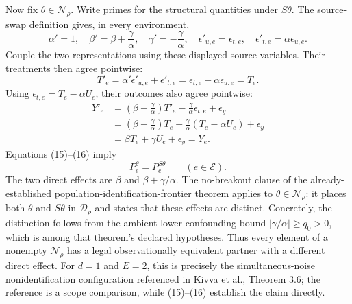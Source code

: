 Now fix \(\theta\in\mathcal N_\rho\).  Write primes for the structural quantities under \(S\theta\).  The source-swap definition gives, in every environment,
\[
 \alpha'=1,
 \quad
 \beta'=\beta+\frac{\gamma}{\alpha},
 \quad
 \gamma'=-\frac{\gamma}{\alpha},
 \quad
 \epsilon'_{u,e}=\epsilon_{t,e},
 \quad
 \epsilon'_{t,e}=\alpha\epsilon_{u,e}.
\]
Couple the two representations using these displayed source variables.  Their treatments then agree pointwise:
\[
 T'_e
 =\alpha'\epsilon'_{u,e}+\epsilon'_{t,e}
 =\epsilon_{t,e}+\alpha\epsilon_{u,e}
 =T_e.
 \tag{15}
\]
Using \(\epsilon_{t,e}=T_e-\alpha U_e\), their outcomes also agree pointwise:
\[
 \begin{aligned}
 Y'_e
 &=\left(\beta+\frac{\gamma}{\alpha}\right)T'_e
   -\frac{\gamma}{\alpha}\epsilon_{t,e}+\epsilon_y\\
 &=\left(\beta+\frac{\gamma}{\alpha}\right)T_e
   -\frac{\gamma}{\alpha}(T_e-\alpha U_e)+\epsilon_y\\
 &=\beta T_e+\gamma U_e+\epsilon_y
 =Y_e.
 \end{aligned}
 \tag{16}
\]
Equations (15)--(16) imply
\[
 P_e^{\theta}=P_e^{S\theta}
 \qquad(e\in\mathcal E).
\]
The two direct effects are \(\beta\) and \(\beta+\gamma/\alpha\).  The no-breakout clause of the already-established population-identification-frontier theorem applies to \(\theta\in\mathcal N_\rho\): it places both \(\theta\) and \(S\theta\) in \(\mathcal D_\rho\) and states that these effects are distinct.  Concretely, the distinction follows from the ambient lower confounding bound \(|\gamma/\alpha|\geq q_0>0\), which is among that theorem's declared hypotheses.  Thus every element of a nonempty \(\mathcal N_\rho\) has a legal observationally equivalent partner with a different direct effect.  For \(d=1\) and \(E=2\), this is precisely the simultaneous-noise nonidentification configuration referenced in Kivva et al., Theorem 3.6; the reference is a scope comparison, while (15)--(16) establish the claim directly.
